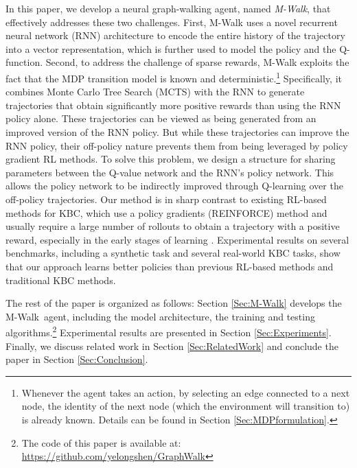 \documentclass{article}
\newcommand{\modelname}{M-Walk}
\begin{document}
	In this paper, we develop a neural graph-walking agent, named \emph{\modelname}, that effectively addresses these two challenges. First, M-Walk uses a novel recurrent neural network (RNN) architecture to encode the entire history of the trajectory into a vector representation, which is further used to model the policy and the Q-function. Second, to address the challenge of sparse rewards, M-Walk exploits the fact that the MDP transition model is known and deterministic.\footnote{Whenever the agent takes an action, by selecting an edge connected to a next node, the identity of the next node (which the environment will transition to) is already known. Details can be found in Section \ref{Sec:MDPformulation}.} Specifically, it combines Monte Carlo Tree Search (MCTS) with the RNN to generate trajectories that obtain significantly more positive rewards than using the RNN policy alone. These trajectories can be viewed as being generated from an improved version of the RNN policy. But while these trajectories can improve the RNN policy, their off-policy nature prevents them from being leveraged by policy gradient RL methods. To solve this problem, we design a structure for sharing parameters between the Q-value network and the RNN's policy network. This allows the policy network to be indirectly improved through Q-learning over the off-policy trajectories. Our method is in sharp contrast to existing RL-based methods for KBC, which use a policy gradients (REINFORCE) method \cite{williams1992simple} and usually require a large number of rollouts to obtain a trajectory with a positive reward, especially in the early stages of learning \cite{gu2016q,wu2017scalable,kakade2002natural}. Experimental results on several benchmarks, including a synthetic task and several real-world KBC tasks, show that our approach learns better policies than previous RL-based methods and traditional KBC methods.

	The rest of the paper is organized as follows: Section \ref{Sec:\modelname} develops the \modelname~agent, including the model architecture, the training and testing algorithms.\footnote{The code of this paper is available at: \url{https://github.com/yelongshen/GraphWalk}} Experimental results are presented in Section \ref{Sec:Experiments}. Finally, we discuss related work in Section \ref{Sec:RelatedWork} and conclude the paper in Section \ref{Sec:Conclusion}.
	
\end{document}
